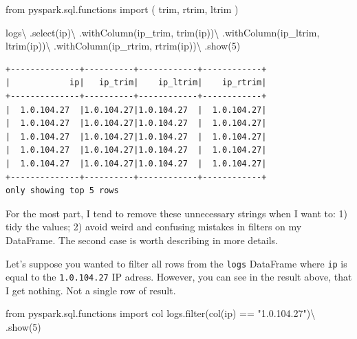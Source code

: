 \documentclass[
  11pt,
  letterpaper,
  DIV=11,
  numbers=noendperiod]{scrreprt}
\newenvironment{Shaded}{\begin{snugshade}}{\end{snugshade}}
\newcommand{\BuiltInTok}[1]{\textcolor[rgb]{0.00,0.23,0.31}{#1}}
\newcommand{\DecValTok}[1]{\textcolor[rgb]{0.68,0.00,0.00}{#1}}
\newcommand{\ImportTok}[1]{\textcolor[rgb]{0.00,0.46,0.62}{#1}}
\newcommand{\NormalTok}[1]{\textcolor[rgb]{0.00,0.23,0.31}{#1}}
\newcommand{\OperatorTok}[1]{\textcolor[rgb]{0.37,0.37,0.37}{#1}}
\newcommand{\StringTok}[1]{\textcolor[rgb]{0.13,0.47,0.30}{#1}}
\begin{document}
\begin{Shaded}
\begin{Highlighting}[]
\ImportTok{from}\NormalTok{ pyspark.sql.functions }\ImportTok{import}\NormalTok{ (}
\NormalTok{    trim, rtrim, ltrim}
\NormalTok{)}

\NormalTok{logs}\OperatorTok{\textbackslash{}}
\NormalTok{    .select(}\StringTok{\textquotesingle{}ip\textquotesingle{}}\NormalTok{)}\OperatorTok{\textbackslash{}}
\NormalTok{    .withColumn(}\StringTok{\textquotesingle{}ip\_trim\textquotesingle{}}\NormalTok{, trim(}\StringTok{\textquotesingle{}ip\textquotesingle{}}\NormalTok{))}\OperatorTok{\textbackslash{}}
\NormalTok{    .withColumn(}\StringTok{\textquotesingle{}ip\_ltrim\textquotesingle{}}\NormalTok{, ltrim(}\StringTok{\textquotesingle{}ip\textquotesingle{}}\NormalTok{))}\OperatorTok{\textbackslash{}}
\NormalTok{    .withColumn(}\StringTok{\textquotesingle{}ip\_rtrim\textquotesingle{}}\NormalTok{, rtrim(}\StringTok{\textquotesingle{}ip\textquotesingle{}}\NormalTok{))}\OperatorTok{\textbackslash{}}
\NormalTok{    .show(}\DecValTok{5}\NormalTok{)}
\end{Highlighting}
\end{Shaded}

\begin{verbatim}
+--------------+----------+------------+------------+
|            ip|   ip_trim|    ip_ltrim|    ip_rtrim|
+--------------+----------+------------+------------+
|  1.0.104.27  |1.0.104.27|1.0.104.27  |  1.0.104.27|
|  1.0.104.27  |1.0.104.27|1.0.104.27  |  1.0.104.27|
|  1.0.104.27  |1.0.104.27|1.0.104.27  |  1.0.104.27|
|  1.0.104.27  |1.0.104.27|1.0.104.27  |  1.0.104.27|
|  1.0.104.27  |1.0.104.27|1.0.104.27  |  1.0.104.27|
+--------------+----------+------------+------------+
only showing top 5 rows
\end{verbatim}

For the most part, I tend to remove these unnecessary strings when I
want to: 1) tidy the values; 2) avoid weird and confusing mistakes in
filters on my DataFrame. The second case is worth describing in more
details.

Let's suppose you wanted to filter all rows from the \texttt{logs}
DataFrame where \texttt{ip} is equal to the \texttt{1.0.104.27} IP
adress. However, you can see in the result above, that I get nothing.
Not a single row of result.

\begin{Shaded}
\begin{Highlighting}[]
\ImportTok{from}\NormalTok{ pyspark.sql.functions }\ImportTok{import}\NormalTok{ col}
\NormalTok{logs.}\BuiltInTok{filter}\NormalTok{(col(}\StringTok{\textquotesingle{}ip\textquotesingle{}}\NormalTok{) }\OperatorTok{==} \StringTok{"1.0.104.27"}\NormalTok{)}\OperatorTok{\textbackslash{}}
\NormalTok{    .show(}\DecValTok{5}\NormalTok{)}
\end{Highlighting}
\end{Shaded}
\end{document}
